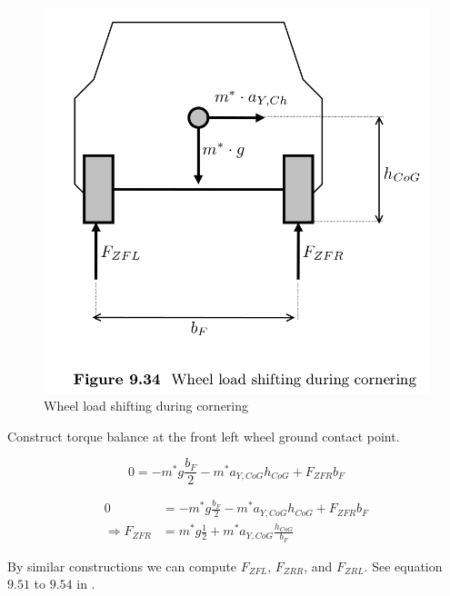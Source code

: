 \begin{figure}
    \centering
    \includegraphics[width=\textwidth]{draft/stolen-figures/wheel-load-shifting-cornering.png}
    \caption{Wheel load shifting during cornering}
    \label{fig:wheel-load-shifting-during-cornering}
\end{figure}

Construct torque balance at the front left wheel ground contact point. 

\begin{equation}
  0 = -m^* g \frac{b_F}{2} - m^* a_{Y,CoG} h_{CoG} + F_{ZFR} b_F
\end{equation}

\begin{align}
  0 &= -m^* g \frac{b_F}{2} - m^* a_{Y,CoG} h_{CoG} + F_{ZFR} b_F \\
  \Rightarrow F_{ZFR} &= m^* g \frac{1}{2} + m^* a_{Y,CoG} \frac{h_{CoG}}{b_F}
\end{align}

By similar constructions we can compute $F_{ZFL}$, $F_{ZRR}$, and $F_{ZRL}$. See equation $9.51$ to $9.54$ in \cite{kiencke}.



